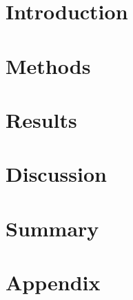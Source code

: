\documentclass[]{article}       %
\makeatletter
\renewenvironment{abstract}{%
    \if@twocolumn
      \section*{\abstractname}%
    \else %
      \begin{center}%
        {\bfseries \Large\abstractname\vspace{\z@}}%
      \end{center}%
      \quotation
    \fi}
    {\if@twocolumn\else\endquotation\fi}
\makeatother
\begin{document}

\begin{abstract}
    
\end{abstract}

\section{Introduction}
  \label{chap:introduction}
  

\section{Methods}
  \label{chap:methods}
  

\section{Results}
  \label{chap:results}
  

\section{Discussion}
  \label{chap:discussion}
  

\section{Summary}
  \label{chap:summary}
  

\pagebreak
\printbibliography

\pagebreak
\section{Appendix}
  \label{chap:appendix}
  




\end{document}
